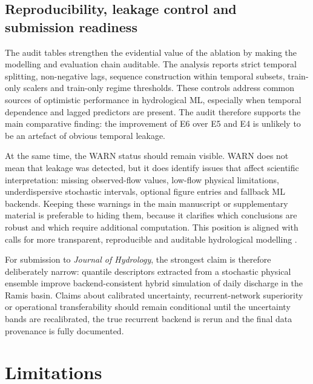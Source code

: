 \documentclass[a4paper,fleqn]{cas-sc}
\begin{document}
\subsection{Reproducibility, leakage control and submission readiness}
\label{subsec:discussion-leakage}

The audit tables strengthen the evidential value of the ablation by
making the modelling and evaluation chain auditable. The analysis
reports strict temporal splitting, non-negative lags, sequence
construction within temporal subsets, train-only scalers and train-only
regime thresholds. These controls address common sources of optimistic
performance in hydrological ML, especially when temporal dependence and
lagged predictors are present. The audit therefore supports the main
comparative finding: the improvement of E6 over E5 and E4 is unlikely
to be an artefact of obvious temporal leakage.

At the same time, the WARN status should remain visible. WARN does not
mean that leakage was detected, but it does identify issues that affect
scientific interpretation: missing observed-flow values, low-flow
physical limitations, underdispersive stochastic intervals, optional
figure entries and fallback ML backends. Keeping these warnings in the
main manuscript or supplementary material is preferable to hiding them,
because it clarifies which conclusions are robust and which require
additional computation. This position is aligned with calls for more
transparent, reproducible and auditable hydrological modelling
\citep{hall2021hydrologist,lees2021benchmarking,arsenault2022continuous}.

For submission to \emph{Journal of Hydrology}, the strongest claim is
therefore deliberately narrow: quantile descriptors extracted from a
stochastic physical ensemble improve backend-consistent hybrid
simulation of daily discharge in the Ramis basin. Claims about
calibrated uncertainty, recurrent-network superiority or operational
transferability should remain conditional until the uncertainty bands
are recalibrated, the true recurrent backend is rerun and the final data
provenance is fully documented.


\section{Limitations}\label{sec:limitations}
\end{document}

